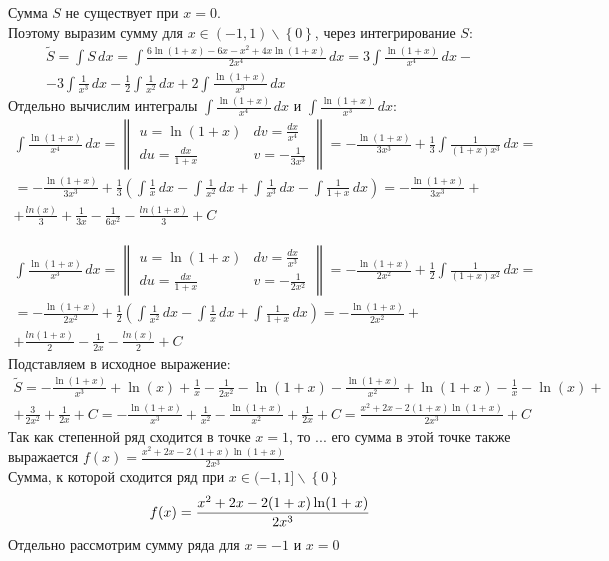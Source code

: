 \documentclass[a5paper, 10pt]{article}
\theoremstyle{definition}
\theoremstyle{plain}
\theoremstyle{remark}
\begin{document}
Сумма $S$  не существует при $x = 0$.\\
Поэтому выразим сумму для $ x \in (-1, 1) \backslash \left\{0 \right\}$, через интегрирование $S$:
\begin{multline*}
\widetilde{S } = \int S \, dx = \int  \frac{6\ln (1+x) - 6x - x^2 + 4x \ln (1+x)}{2x^4} \, dx = 3  \int  \frac{\ln (1+x)}{x^4}  \, dx -\\
- 3\int  \frac{1}{x^3} \, dx - \frac{1}{2}\int  \frac{1}{x^2} \, dx + 2 \int  \frac{\ln (1+x)}{x^3} \, dx
\end{multline*}
Отдельно вычислим интегралы $\int  \frac{\ln (1+x)}{x^4}  \, dx$ и $\int  \frac{\ln (1+x)}{x^3} \, dx$:
\begin{multline*}
\int  \frac{\ln (1+x)}{x^4}  \, dx = 
\begin{Vmatrix}
u = \ln (1+x) & dv = \frac{dx}{x^4} \\
du = \frac{dx}{1+x} & v = -\frac{1}{3x^3}
\end{Vmatrix}
= -\frac{\ln (1+x)}{3x^3} + \frac{1}{3}\int  \frac{1}{(1+x)x^3}  \, dx =\\
= -\frac{\ln (1+x)}{3x^3} +\frac{1}{3} \left( \int  \frac{1}{x} \, dx - \int  \frac{1}{x^2} \, dx+ \int  \frac{1}{x^3} \, dx -\int  \frac{1}{1+x} \, dx\right) = -\frac{\ln (1+x)}{3x^3} +\\
+\frac{ln(x)}{3} + \frac{1}{3x} - \frac{1}{6x^2} - \frac{ln(1+x)}{3}+C
\end{multline*}

\begin{multline*}
\int  \frac{\ln (1+x)}{x^3}  \, dx = 
\begin{Vmatrix}
u = \ln (1+x) & dv = \frac{dx}{x^3} \\
du = \frac{dx}{1+x} & v = -\frac{1}{2x^2}
\end{Vmatrix}
= -\frac{\ln (1+x)}{2x^2} + \frac{1}{2}\int  \frac{1}{(1+x)x^2}  \, dx =\\
= -\frac{\ln (1+x)}{2x^2} +\frac{1}{2} \left(\int  \frac{1}{x^2} \, dx - \int  \frac{1}{x} \, dx  +\int  \frac{1}{1+x} \, dx\right) = -\frac{\ln (1+x)}{2x^2} +\\
+\frac{ln(1+x)}{2} - \frac{1}{2x} - \frac{ln(x)}{2}+C
\end{multline*}
Подставляем в исходное выражение:
\begin{multline*}
\widetilde{S} =  -\frac{\ln (1+x)}{x^3} +\ln(x) + \frac{1}{x} - \frac{1}{2x^2} - \ln(1+x)
-\frac{\ln (1+x)}{x^2} +\ln(1+x) - \frac{1}{x} - \ln(x) +\\
+ \frac{3}{2x^2} + \frac{1}{2x} + C=  -\frac{\ln (1+x)}{x^3} + \frac{1}{x^2} -\frac{\ln (1+x)}{x^2}+ \frac{1}{2x} +C=
\frac{ x^2 + 2x -2(1+x) \ln(1+x)}{2x^3}+C
\end{multline*}
Так как степенной ряд сходится в точке $x=1$, то ... его сумма в этой точке также выражается $ f(x) =\frac{ x^2 + 2x -2(1+x) \ln(1+x)}{2x^3}$\\
 Сумма, к которой сходится ряд при $ x \in (-1, 1] \backslash \left\{0 \right\}$
\begin{equation*}
 f(x) =\frac{ x^2 + 2x -2(1+x) \ln(1+x)}{2x^3}\\
\end{equation*}
Отдельно рассмотрим сумму ряда для  $x = -1$ и $x = 0$
\end{document}
